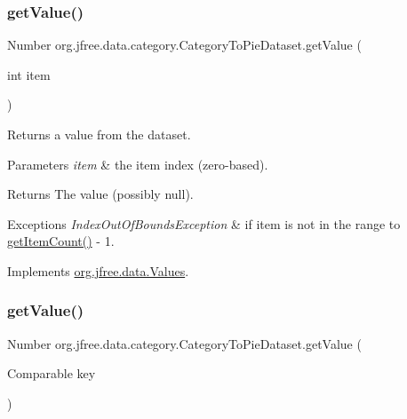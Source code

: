 \subsubsection{\texorpdfstring{get\+Value()}{getValue()}\hspace{0.1cm}{\footnotesize\ttfamily [1/2]}}
{\footnotesize\ttfamily Number org.\+jfree.\+data.\+category.\+Category\+To\+Pie\+Dataset.\+get\+Value (\begin{DoxyParamCaption}\item[{int}]{item }\end{DoxyParamCaption})}

Returns a value from the dataset.


\begin{DoxyParams}{Parameters}
{\em item} & the item index (zero-\/based).\\
\hline
\end{DoxyParams}
\begin{DoxyReturn}{Returns}
The value (possibly {\ttfamily null}).
\end{DoxyReturn}

\begin{DoxyExceptions}{Exceptions}
{\em Index\+Out\+Of\+Bounds\+Exception} & if {\ttfamily item} is not in the range {} to {\ttfamily \mbox{\hyperlink{classorg_1_1jfree_1_1data_1_1category_1_1_category_to_pie_dataset_a7536f863e26d692f65131df0ed9150c3}{get\+Item\+Count()}} -\/ 1}. \\
\hline
\end{DoxyExceptions}


Implements \mbox{\hyperlink{interfaceorg_1_1jfree_1_1data_1_1_values_a660d7e60de9e6ed7a3d2c22eb6578ced}{org.\+jfree.\+data.\+Values}}.

\mbox{\label{classorg_1_1jfree_1_1data_1_1category_1_1_category_to_pie_dataset_a1252b049b706dac0ec3c3788bb25d1bf}} 
\subsubsection{\texorpdfstring{get\+Value()}{getValue()}\hspace{0.1cm}{\footnotesize\ttfamily [2/2]}}
{\footnotesize\ttfamily Number org.\+jfree.\+data.\+category.\+Category\+To\+Pie\+Dataset.\+get\+Value (\begin{DoxyParamCaption}\item[{Comparable}]{key }\end{DoxyParamCaption})}

